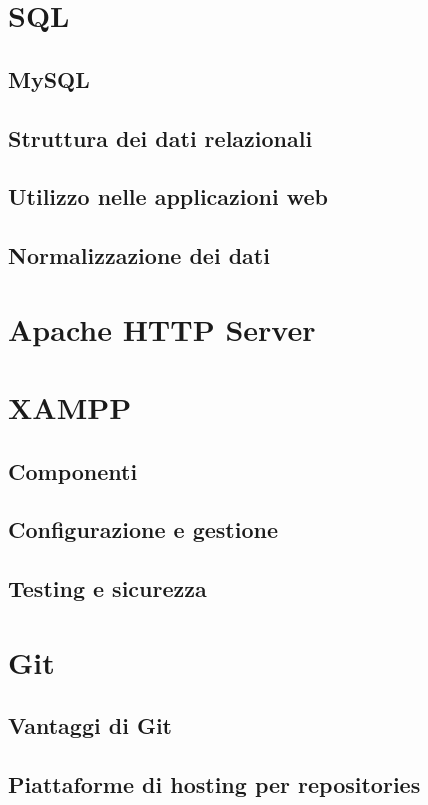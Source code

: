 \section{SQL}
\subsection{MySQL}
\subsection{Struttura dei dati relazionali}
\subsection{Utilizzo nelle applicazioni web}
\subsection{Normalizzazione dei dati}

\section{Apache HTTP Server}

\section{XAMPP}
\subsection{Componenti}
\subsection{Configurazione e gestione}
\subsection{Testing e sicurezza}

\section{Git}
\subsection{Vantaggi di Git}
\subsection{Piattaforme di hosting per repositories}


